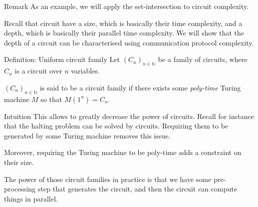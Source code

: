 \documentclass[a4paper]{article}
\begin{document}
\begin{parag}{Remark}
    As an example, we will apply the set-intersection to circuit complexity.

    Recall that circuit have a size, which is basically their time complexity, and a depth, which is basically their parallel time complexity. We will show that the depth of a circuit can be characterised using communication protocol complexity.
\end{parag}

\begin{parag}{Definition: Uniform circuit family}
    Let $\left(C_n\right)_{n \in \mathbb{N}}$ be a family of circuits, where $C_n$ is a circuit over $n$ variables.

    $\left(C_n\right)_{n \in \mathbb{N}}$ is said to be a  circuit family if there exists some \textit{poly-time} Turing machine $M$ so that $M\left(1^n\right) = C_n$.

    \begin{subparag}{Intuition}
        This allows to greatly decrease the power of circuits. Recall for instance that the halting problem can be solved by circuits. Requiring them to be generated by some Turing machine removes this issue. 

        Moreover, requiring the Turing machine to be poly-time adds a constraint on their size.

        The power of those circuit families in practice is that we have some pre-processing step that generates the circuit, and then the circuit can compute things in parallel.
    \end{subparag}
\end{parag}
\end{document}
